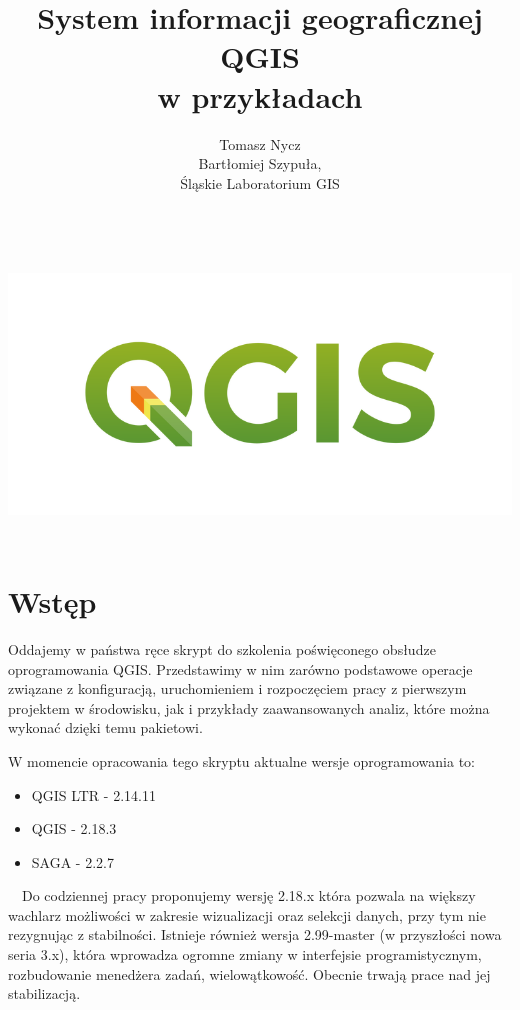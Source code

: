 \documentclass[12pt,a4paper]{book}
\begin{document}
\frontmatter
\includegraphics[width=15.949cm,height=7.645cm]{logo-qgis3}	
\title{System informacji geograficznej \\\Huge{QGIS} \\w przykładach}
\author{Tomasz Nycz \\Bartłomiej Szypuła, \\Śląskie Laboratorium GIS}
\date{}
\maketitle

\chapter{Wstęp}
Oddajemy w państwa ręce skrypt do szkolenia poświęconego obsłudze oprogramowania QGIS. Przedstawimy w nim zarówno podstawowe operacje związane z konfiguracją, uruchomieniem i rozpoczęciem pracy z pierwszym projektem w środowisku, jak i przykłady zaawansowanych analiz, które można wykonać dzięki temu pakietowi.

W momencie opracowania tego skryptu aktualne wersje oprogramowania to:
\begin{itemize}
\item QGIS LTR - 2.14.11
\item QGIS - 2.18.3
\item SAGA - 2.2.7
\end{itemize}
\ \ Do codziennej pracy proponujemy wersję 2.18.x która pozwala na większy wachlarz możliwości w zakresie wizualizacji oraz selekcji danych, przy tym nie rezygnując z stabilności. Istnieje również wersja 2.99-master (w przyszłości nowa seria 3.x), która wprowadza ogromne zmiany w interfejsie programistycznym, rozbudowanie menedżera zadań, wielowątkowość. Obecnie trwają prace nad jej stabilizacją.
\end{document}
